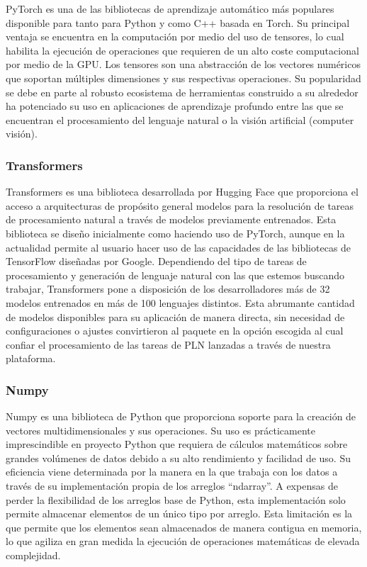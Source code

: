 PyTorch \cite{dependencies:pytorch} es una de las bibliotecas de aprendizaje automático más populares disponible para tanto para Python y como C++ basada en Torch. Su principal ventaja se encuentra en la computación por medio del uso de tensores, lo cual habilita la ejecución de operaciones que requieren de un alto coste computacional por medio de la GPU. Los tensores son una abstracción de los vectores numéricos que soportan múltiples dimensiones y sus respectivas operaciones. Su popularidad se debe en parte al robusto ecosistema de herramientas construido a su alrededor ha potenciado su uso en aplicaciones de aprendizaje profundo entre las que se encuentran el procesamiento del lenguaje natural o la visión artificial (computer visión).

\subsubsection{Transformers}

Transformers \cite{tech:transformers} es una biblioteca desarrollada por Hugging Face que proporciona el acceso a arquitecturas de propósito general modelos para la resolución de tareas de procesamiento natural a través de modelos previamente entrenados. Esta biblioteca se diseño inicialmente como haciendo uso de PyTorch, aunque en la actualidad permite al usuario hacer uso de las capacidades de las bibliotecas de TensorFlow diseñadas por Google. Dependiendo del tipo de tareas de procesamiento y generación de lenguaje natural con las que estemos buscando trabajar, Transformers pone a disposición de los desarrolladores más de 32 modelos entrenados en más de 100 lenguajes distintos. Esta abrumante cantidad de modelos disponibles para su aplicación de manera directa, sin necesidad de configuraciones o ajustes convirtieron al paquete en la opción escogida al cual confiar el procesamiento de las tareas de PLN lanzadas a través de nuestra plataforma.

\subsubsection{Numpy}

Numpy \cite{dependencies:numpy} es una biblioteca de Python que proporciona soporte para la creación de vectores multidimensionales y sus operaciones. Su uso es prácticamente imprescindible en proyecto Python que requiera de cálculos matemáticos sobre grandes volúmenes de datos debido a su alto rendimiento y facilidad de uso.
Su eficiencia viene determinada por la manera en la que trabaja con los datos a través de su implementación propia de los arreglos “ndarray”. A expensas de perder la flexibilidad de los arreglos base de Python, esta implementación solo permite almacenar elementos de un único tipo por arreglo. Esta limitación es la que permite que los elementos sean almacenados de manera contigua en memoria, lo que agiliza en gran medida la ejecución de operaciones matemáticas de elevada complejidad.

